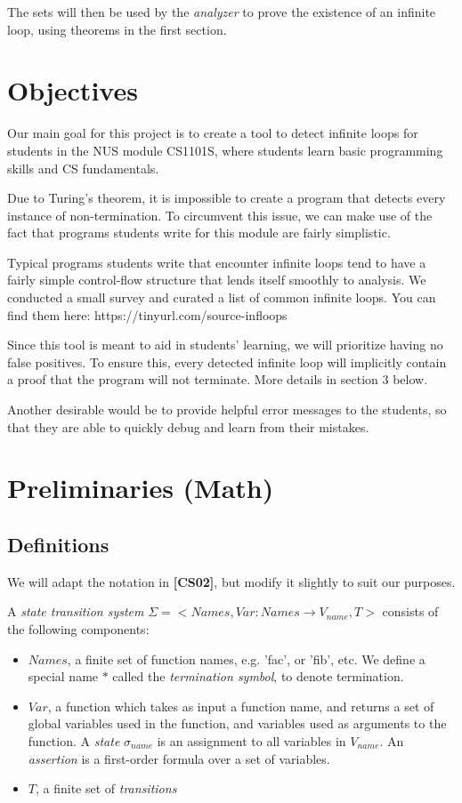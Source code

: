 The sets will then be used by the {\it analyzer} to prove the existence of an infinite loop, using theorems in the first section.

\section{Objectives}
Our main goal for this project is to create a tool to detect infinite loops for students in the NUS module CS1101S, where students learn basic programming skills and CS fundamentals.

Due to Turing's theorem, it is impossible to create a program that detects every instance of non-termination. To circumvent this issue, we can make use of the fact that programs students write for this module are fairly simplistic.

Typical programs students write that encounter infinite loops tend to have a fairly simple control-flow structure that lends itself smoothly to analysis.
We conducted a small survey and curated a list of common infinite loops. You can find them here: https://tinyurl.com/source-infloops

Since this tool is meant to aid in students' learning, we will prioritize having no false positives. To ensure this, every detected infinite loop will implicitly contain a proof that the program will not terminate. More details in section 3 below.

Another desirable would be to provide helpful error messages to the students, so that they are able to quickly debug and learn from their mistakes.
\section{Preliminaries (Math)}

\subsection{Definitions}
We will adapt the notation in \textbf{[CS02]}, but modify it slightly to suit our purposes.

A {\it state transition system} $\Sigma=<Names,Var : Names\to V_{name}, T>$  consists of the following components:

\begin{itemize}
  \item $Names$, a finite set of function names, e.g. 'fac', or 'fib', etc. We define a special name $*$ called the {\it termination symbol}, to denote termination.

  \item $Var$, a function which takes as input a function name, and returns a set of global variables used in the function, and variables used as arguments to the function. A {\it state} $\sigma_{name}$ is an assignment to all variables in $V_{name}$. An {\it assertion} is a first-order formula over a set of variables.

  \item $T$, a finite set of {\it transitions}
\end {itemize}

